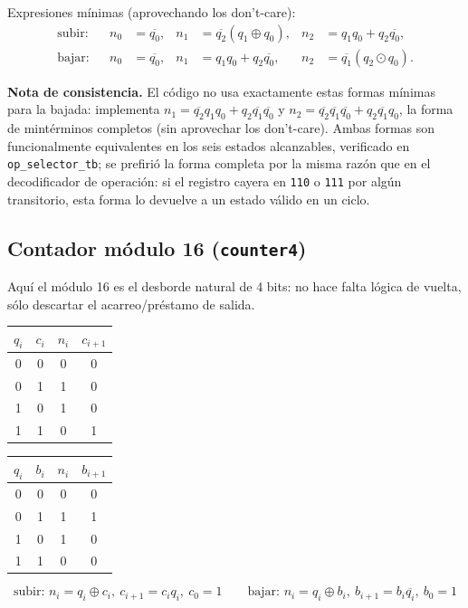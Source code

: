 \documentclass[11pt,a4paper]{article}
\newcommand{\bit}[1]{\texttt{#1}}
\newcommand{\sig}[1]{\texttt{#1}}
\newcommand{\nott}[1]{\overline{#1}}
\begin{document}
Expresiones mínimas (aprovechando los don't-care):
\[
\begin{aligned}
\text{subir:}&& n_0&=\nott{q_0}, & n_1&=\nott{q_2}(q_1\oplus q_0), & n_2&=q_1q_0+q_2\nott{q_0},\\
\text{bajar:}&& n_0&=\nott{q_0}, & n_1&=q_1q_0+q_2\nott{q_0}, & n_2&=\nott{q_1}(q_2\odot q_0).
\end{aligned}
\]

\textbf{Nota de consistencia.} El código no usa exactamente estas formas mínimas para la bajada: implementa $n_1=\nott{q_2}q_1q_0+q_2\nott{q_1}\nott{q_0}$ y $n_2=\nott{q_2}\nott{q_1}\nott{q_0}+q_2\nott{q_1}q_0$, la forma de mintérminos completos (sin aprovechar los don't-care). Ambas formas son funcionalmente equivalentes en los seis estados alcanzables, verificado en \sig{op\_selector\_tb}; se prefirió la forma completa por la misma razón que en el decodificador de operación: si el registro cayera en \bit{110} o \bit{111} por algún transitorio, esta forma lo devuelve a un estado válido en un ciclo.

\subsection{Contador módulo 16 (\sig{counter4})}

Aquí el módulo 16 es el desborde natural de 4 bits: no hace falta lógica de vuelta, sólo descartar el acarreo/préstamo de salida.

\begin{center}
\begin{tabular}{@{}cc|cc@{}}
\toprule
$q_i$ & $c_i$ & $n_i$ & $c_{i+1}$ \\
\midrule
0&0&0&0\\ 0&1&1&0\\ 1&0&1&0\\ 1&1&0&1\\
\bottomrule
\end{tabular}
\qquad
\begin{tabular}{@{}cc|cc@{}}
\toprule
$q_i$ & $b_i$ & $n_i$ & $b_{i+1}$ \\
\midrule
0&0&0&0\\ 0&1&1&1\\ 1&0&1&0\\ 1&1&0&0\\
\bottomrule
\end{tabular}
\end{center}

\[
\text{subir: } n_i=q_i\oplus c_i,\ c_{i+1}=c_i q_i,\ c_0=1
\qquad
\text{bajar: } n_i=q_i\oplus b_i,\ b_{i+1}=b_i\nott{q_i},\ b_0=1
\]
\end{document}
